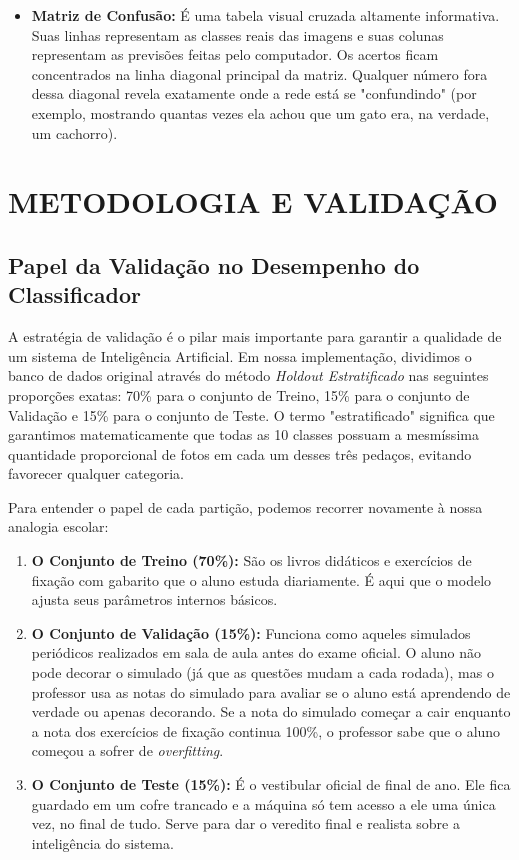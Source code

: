 \documentclass[12pt,a4paper]{article}
\begin{document}
\begin{itemize}
    \item \textbf{Matriz de Confusão:} É uma tabela visual cruzada altamente informativa. Suas linhas representam as classes reais das imagens e suas colunas representam as previsões feitas pelo computador. Os acertos ficam concentrados na linha diagonal principal da matriz. Qualquer número fora dessa diagonal revela exatamente onde a rede está se "confundindo" (por exemplo, mostrando quantas vezes ela achou que um gato era, na verdade, um cachorro).
\end{itemize}

\newpage
\section{METODOLOGIA E VALIDAÇÃO}
\subsection{Papel da Validação no Desempenho do Classificador}
A estratégia de validação é o pilar mais importante para garantir a qualidade de um sistema de Inteligência Artificial. Em nossa implementação, dividimos o banco de dados original através do método \textit{Holdout Estratificado} nas seguintes proporções exatas: 70\% para o conjunto de Treino, 15\% para o conjunto de Validação e 15\% para o conjunto de Teste. O termo "estratificado" significa que garantimos matematicamente que todas as 10 classes possuam a mesmíssima quantidade proporcional de fotos em cada um desses três pedaços, evitando favorecer qualquer categoria.

Para entender o papel de cada partição, podemos recorrer novamente à nossa analogia escolar:
\begin{enumerate}
    \item \textbf{O Conjunto de Treino (70\%):} São os livros didáticos e exercícios de fixação com gabarito que o aluno estuda diariamente. É aqui que o modelo ajusta seus parâmetros internos básicos.
    \item \textbf{O Conjunto de Validação (15\%):} Funciona como aqueles simulados periódicos realizados em sala de aula antes do exame oficial. O aluno não pode decorar o simulado (já que as questões mudam a cada rodada), mas o professor usa as notas do simulado para avaliar se o aluno está aprendendo de verdade ou apenas decorando. Se a nota do simulado começar a cair enquanto a nota dos exercícios de fixação continua 100\%, o professor sabe que o aluno começou a sofrer de \textit{overfitting}.
    \item \textbf{O Conjunto de Teste (15\%):} É o vestibular oficial de final de ano. Ele fica guardado em um cofre trancado e a máquina só tem acesso a ele uma única vez, no final de tudo. Serve para dar o veredito final e realista sobre a inteligência do sistema.
\end{enumerate}
\end{document}
